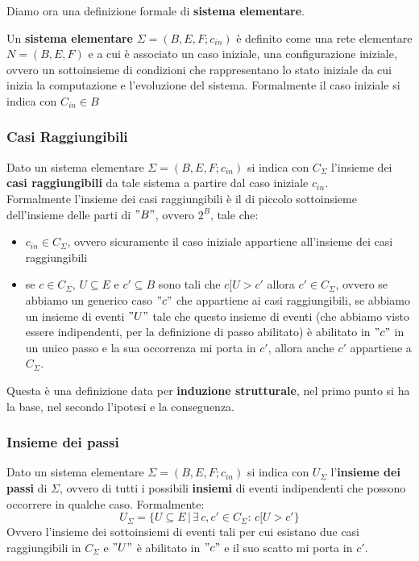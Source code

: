 Diamo ora una definizione formale di \textbf{sistema elementare}.
\begin{definizione}
  Un \textbf{sistema elementare} $\Sigma=(B, E, F;c_{in})$ è definito come una
  rete elementare $N=(B, E, F)$ e a cui è associato un caso iniziale, una configurazione
  iniziale, ovvero un sottoinsieme di condizioni che rappresentano lo stato
  iniziale da cui inizia la computazione e l'evoluzione del sistema. Formalmente
  il caso iniziale si indica con $C_{in}\in B$ 
\end{definizione} \vspace{5mm} %
\subsubsection{Casi Raggiungibili}
\begin{definizione}
  Dato un sistema elementare $\Sigma=(B, E, F;c_{in})$ si indica con $C_\Sigma$
  l'insieme dei \textbf{casi raggiungibili} da tale sistema a partire dal caso
  iniziale $c_{in}$.\\
  Formalmente l'insieme dei casi raggiungibili è il di piccolo sottoinsieme
  dell'insieme delle parti di $"B"$, ovvero $2^B$, tale che:
  \begin{itemize}
    \item $c_{in}\in C_\Sigma$, ovvero sicuramente il caso iniziale appartiene
    all'insieme dei casi raggiungibili
    \item se $c\in C_\Sigma,\, U\subseteq E$ e $c'\subseteq B$ sono tali che
    $c[U>c'$ allora $c'\in C_\Sigma$, ovvero se abbiamo un generico caso $"c"$ che
    appartiene ai casi raggiungibili, se abbiamo un insieme di eventi $"U"$ tale che
    questo insieme di eventi (che abbiamo visto essere indipendenti, per la
    definizione di passo abilitato) è abilitato
    in $"c"$ in un unico passo e la sua occorrenza mi porta in $c'$, allora anche
    $c'$ appartiene a $C_\Sigma$. 
  \end{itemize}
 \begin{nota}
  Questa è una definizione data per \textbf{induzione strutturale}, nel primo
  punto si ha la base, nel secondo l'ipotesi e la conseguenza.
 \end{nota}
\end{definizione} \vspace{5mm} %
\subsubsection{Insieme dei passi}
\begin{definizione}
  Dato un sistema elementare $\Sigma=(B, E, F;c_{in})$ si indica con $U_\Sigma$
  l'\textbf{insieme dei passi} di $\Sigma$, ovvero di tutti i possibili \textbf{insiemi}
  di eventi indipendenti che possono occorrere in qualche caso. Formalmente:
  \[U_\Sigma =\{U\subseteq E\,|\,\exists\, c, c'\in C_\Sigma :\, c[U>c'\}\]
  Ovvero l'insieme dei sottoinsiemi di eventi tali per cui esistano due casi
  raggiungibili in $C_\Sigma$ e $"U"$ è abilitato in $"c"$ e il suo scatto mi porta
  in $c'$.
\end{definizione} \vspace{5mm} %
